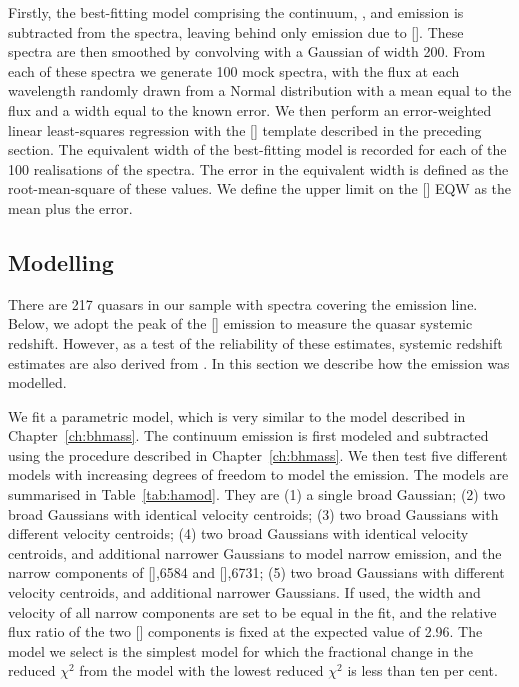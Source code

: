 Firstly, the best-fitting model comprising the continuum, , and \hb emission is subtracted from the spectra, leaving behind only emission due to [].
These spectra are then smoothed by convolving with a Gaussian of width 200\kms. 
From each of these spectra we generate 100 mock spectra, with the flux at each wavelength randomly drawn from a Normal distribution with a mean equal to the flux and a width equal to the known error. 
We then perform an error-weighted linear least-squares regression with the [] template described in the preceding section.
The equivalent width of the best-fitting model is recorded for each of the 100 realisations of the spectra. 
The error in the equivalent width is defined as the root-mean-square of these values.
We define the upper limit on the [] EQW as the mean plus the error. 

\subsection{Modelling \hans}

There are 217 quasars in our sample with spectra covering the \ha emission line. 
Below, we adopt the peak of the [] emission to measure the quasar systemic redshift. 
However, as a test of the reliability of these estimates, systemic redshift estimates are also derived from \ha. 
In this section we describe how the \ha emission was modelled. 

We fit a parametric model, which is very similar to the model described in Chapter~\ref{ch:bhmass}. 
The continuum emission is first modeled and subtracted using the procedure described in Chapter~\ref{ch:bhmass}. 
We then test five different models with increasing degrees of freedom to model the \ha emission. 
The models are summarised in Table~\ref{tab:hamod}. 
They are (1) a single broad Gaussian; (2) two broad Gaussians with identical velocity centroids; (3) two broad Gaussians with different velocity centroids; (4) two broad Gaussians with identical velocity centroids, and additional narrower Gaussians to model narrow \ha emission, and the narrow components of [],6584 and [],6731; (5) two broad Gaussians with different velocity centroids, and additional narrower Gaussians. 
If used, the width and velocity of all narrow components are set to be equal in the fit, and the relative flux ratio of the two [] components is fixed at the expected value of 2.96.
The model we select is the simplest model for which the fractional change in the reduced $\chi^2$ from the model with the lowest reduced $\chi^2$ is less than ten per cent. 

